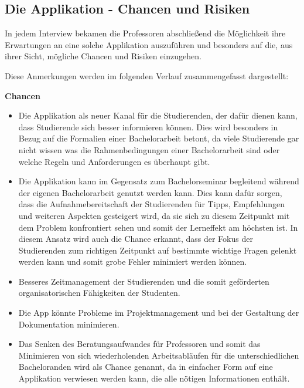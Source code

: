 \documentclass[bibliography=totoc,listof=totoc,BCOR=5mm,DIV=12,oneside]{scrbook}
\begin{document}
\newpage
\subsection{Die Applikation - Chancen und Risiken}
\par In jedem Interview bekamen die Professoren abschließend die Möglichkeit ihre Erwartungen an eine solche Applikation auszuführen und besonders auf die, aus ihrer Sicht, mögliche Chancen und Risiken einzugehen. 
\par \bigskip Diese Anmerkungen werden im folgenden Verlauf zusammengefasst dargestellt:
\par \bigskip \textbf{Chancen}
\begin{itemize}
\item Die Applikation als neuer Kanal für die Studierenden, der dafür dienen kann, dass Studierende sich besser informieren können. Dies wird besonders in Bezug auf die Formalien einer Bachelorarbeit betont, da viele Studierende gar nicht wissen was die Rahmenbedingungen einer Bachelorarbeit sind oder welche Regeln und Anforderungen es überhaupt gibt.
\item Die Applikation kann im Gegensatz zum Bachelorseminar begleitend während der eigenen Bachelorarbeit genutzt werden kann. Dies kann dafür sorgen, dass die Aufnahmebereitschaft der Studierenden für Tipps, Empfehlungen und weiteren Aspekten gesteigert wird, da sie sich zu diesem Zeitpunkt mit dem Problem konfrontiert sehen und somit der Lerneffekt am höchsten ist. In diesem Ansatz wird auch die Chance erkannt, dass der Fokus der Studierenden zum richtigen Zeitpunkt auf bestimmte wichtige Fragen gelenkt werden kann und somit grobe Fehler minimiert werden können.
\item Besseres Zeitmanagement der Studierenden und die somit geförderten organisatorischen Fähigkeiten der Studenten.
\item Die App könnte Probleme im Projektmanagement und bei der Gestaltung der Dokumentation minimieren.
\item Das Senken des Beratungsaufwandes für Professoren und somit das Minimieren von sich wiederholenden Arbeitsabläufen für die unterschiedlichen Bacheloranden wird als Chance genannt, da in einfacher Form auf eine Applikation verwiesen werden kann, die alle nötigen Informationen enthält.
\end{itemize}
\end{document}
